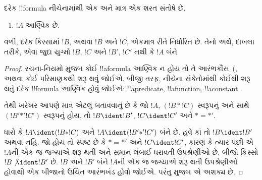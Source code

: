 \documentclass[../../../include/open-logic-section]{subfiles}
\begin{document}
\begin{prop}[એકમાત્ર વાચનીયતા]
દરેક !!{formula} નીચેનામાંથી એક અને માત્ર એક શરત સંતોષે છે.
\begin{enumerate}
\item $!A$ આણ્વિક છે.







\end{enumerate}
વળી, દરેક કિસ્સામાં $!B$, અથવા $!B$ અને $!C$, એકમાત્ર રીતે
નિર્ધારિત છે. તેનો અર્થ, દાખલા તરીકે, એવા જુદા યુગ્મો $!B$, $!C$ અને
$!B'$, $!C'$ નથી કે $!A$ બંને
\end{prop}

\begin{proof}
રચના-નિયમો મુજબ કોઈ !!a{formula} આણ્વિક ન હોય તો તે આરંભકૌંસ~(,
 અથવા કોઈ પરિમાણકથી શરૂ થવું જોઈએ. બીજી
તરફ, નીચેના સંકેતોમાંથી કોઈથી શરૂ થતું દરેક !!{formula} આણ્વિક હોવું
જોઈએ: !!a{predicate}, !!a{function}, !!a{constant}
.

તેથી ખરેખર આપણે માત્ર એટલું બતાવવાનું છે કે જો $!A$, $(!B\ast !C)$
સ્વરૂપનું અને સાથે $(!B'\mathbin{\ast'}!C')$ સ્વરૂપનું હોય, તો
$!B\ident !B'$, $!C\ident !C'$ અને $\ast={\ast'}$.

ધારો કે $!A\ident(!B\ast !C)$ અને
$!A\ident(!B'\mathbin{\ast'}!C')$ બંને છે. હવે કાં તો
$!B\ident !B'$ અથવા નહિ. જો હોય તો સ્પષ્ટ છે કે $\ast={\ast'}$ અને
$!C\ident !C'$, કારણ કે ત્યાર પછી એ $!A$ની એક જ જગ્યાએ શરૂ થતી અને
સમાન લંબાઈ ધરાવતી ઉપશ્રેણીઓ છે. બીજો કિસ્સો $!B\not\ident !B'$ છે.
$!B$ અને $!B'$ બંને $!A$ની એક જ જગ્યાએ શરૂ થતી ઉપશ્રેણીઓ હોવાથી
એક બીજાનો ઉચિત આરંભખંડ હોવો જોઈએ. પરંતુ
 મુજબ એ અશક્ય છે.
\end{proof}
\end{document}
